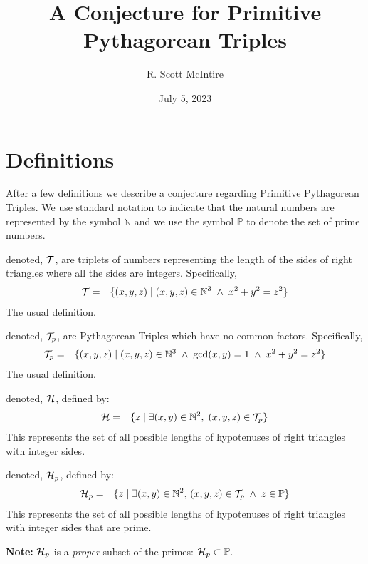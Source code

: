 \documentclass{article}
\title{A Conjecture for Primitive Pythagorean Triples}
\author{R. Scott McIntire}
\date{July 5, 2023}
\theoremstyle{definition}
\begin{document}
\maketitle

\section{Definitions}
After a few definitions we describe a conjecture regarding Primitive Pythagorean Triples.
We use standard notation to indicate that the natural numbers are represented by the symbol $\mathbb{N}$ and 
we use the symbol $\mathbb{P}$ to denote the set of prime numbers.


 denoted, ${\cal T}$, are  triplets of numbers representing the length of the sides of
right triangles where all the sides are integers. Specifically,
\begin{eqnarray}
  {\cal T} & = & \{ (x,y,z) \; | \; (x,y,z) \in \mathbb{N}^3 \; \wedge \; x^2 + y^2 = z^2 \}
\end{eqnarray}
The usual definition.

 denoted, ${\cal T}_p$, are Pythagorean Triples which have no common factors. Specifically,
\begin{eqnarray}
  {\cal T}_p & = & \{ (x,y,z) \; | \; (x,y,z) \in \mathbb{N}^3 \; \wedge \; \gcd(x,y) = 1 \; \wedge \; x^2 + y^2 = z^2 \}
\end{eqnarray}
The usual definition.

 denoted, ${\cal H}$, defined by:
\begin{eqnarray}
  {\cal H} & = & \{ z \; | \; \exists (x,y) \in \mathbb{N}^2, \;  (x,y,z) \in {\cal T}_p \}
\end{eqnarray}
This represents the set of all possible lengths of hypotenuses of right triangles with integer sides.

 denoted, ${\cal H}_p$, defined by:
\begin{eqnarray}
  {\cal H}_p & = & \{ z \; | \; \exists (x,y) \in \mathbb{N}^2, \, (x,y,z) \in {\cal T}_p \; \wedge \; z \in \mathbb{P} \}
\end{eqnarray}
This represents the set of all possible lengths of hypotenuses of right triangles with integer sides that are prime.

{\bf Note:} ${\cal H}_p$ is a {\em proper\/} subset of the primes: ${\cal H}_p \subset \mathbb{P}$.
\end{document}

